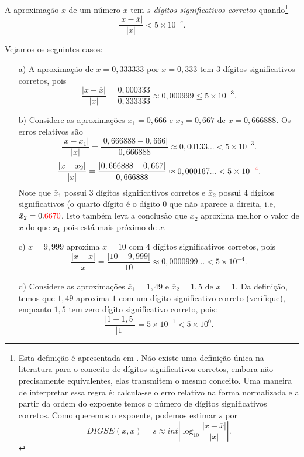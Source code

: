 \begin{defn}\label{def:num_dig_sig_corretos}
A aproximação $\overline{x}$ de um número $x$ tem $s$ \emph{dígitos significativos corretos} quando\footnote{Esta definição é apresentada em \cite{Burden2013}. Não existe uma definição única na literatura para o conceito de dígitos significativos corretos, embora não precisamente equivalentes, elas transmitem o mesmo conceito.
Uma maneira de interpretar essa regra é: calcula-se o erro relativo na forma normalizada e a partir da ordem do expoente temos o número de dígitos significativos corretos. Como queremos o expoente, podemos estimar $s$ por
$$ DIGSE(x,\bar{x})=s \approx int \left|\log_{10} \frac{|x-\overline{x}|}{|x|}\right|. $$
}
$$
\frac{|x-\overline{x}|}{|x|} < 5\times 10^{-s}.
$$
\end{defn}


\begin{ex} Vejamos os seguintes casos:
\begin{itemize}
\item[a)] A aproximação de $x=0,333333$ por $\overline{x}=0,333$ tem $3$ dígitos significativos corretos, pois
  \begin{equation*}
    \frac{|x-\overline{x}|}{|x|} = \frac{0,000333}{0,333333} \approx 0,000999 \leq 5\times 10^{-\pmb{3}}.
  \end{equation*}
\item[b)] Considere as aproximações $\bar{x}_1=0,666$ e $\bar{x}_2=0,667$ de $x=0,666888$. Os erros relativos são
  $$
    \frac{|x-\bar{x}_1|}{|x|} = \frac{|0,666888-0,666|}{0,666888} \approx 0,00133...< 5\times 10^{-3}.
  $$
  $$
    \frac{|x-\bar{x}_2|}{|x|} = \frac{|0,666888-0,667|}{0,666888} \approx 0,000167...< 5\times 10^{-{\color{red}{4}}}.
  $$
  Note que $\bar{x}_1$ possui $3$ dígitos significativos corretos e $\bar{x}_2$ possui $4$ dígitos significativos (o quarto dígito é o dígito $0$ que não aparece a direita, i.e, $\bar{x}_2=0.{\color{red}{6670}}$. Isto também leva a conclusão que $x_2$ aproxima melhor o valor de $x$ do que $x_1$ pois está mais próximo de $x$.
  
\item[c)] $\overline{x} = 9,999$ aproxima $x = 10$ com $4$ dígitos significativos corretos, pois  
  \begin{equation*}
    \frac{|x-\overline{x}|}{|x|} = \frac{|10 - 9,999|}{10} \approx 0,0000999...< 5\times 10^{-4}.
  \end{equation*}
\item[d)] Considere as aproximações $\overline{x}_1 = 1,49$ e $\overline{x}_2 = 1,5$ de $x = 1$. Da definição, temos que $1,49$ aproxima $1$ com um dígito significativo correto (verifique), enquanto $1,5$ tem zero dígito significativo correto, pois:
  \begin{equation*}
    \frac{|1-1,5|}{|1|} = 5\times 10^{-1} < 5\times 10^{0}.
  \end{equation*}
\end{itemize}
\end{ex}

